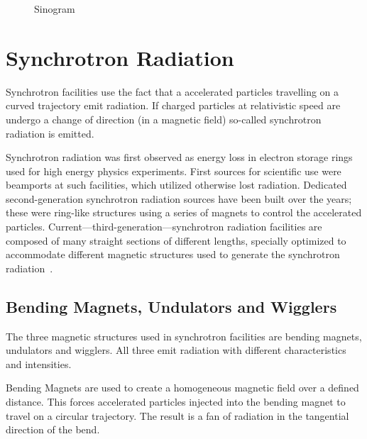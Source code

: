 \begin{figure}
	\caption{Sinogram}
	\label{fig:sinogram}
\end{figure}

\section{Synchrotron Radiation}
Synchrotron facilities use the fact that a accelerated particles travelling on a curved trajectory emit radiation. If charged particles at relativistic speed are undergo a change of direction (\ie in a magnetic field) so-called synchrotron radiation is emitted. 

Synchrotron radiation was first observed as energy loss in electron storage rings used for high energy physics experiments. First sources for scientific use were beamports at such facilities, which utilized otherwise lost radiation. Dedicated second-generation synchrotron radiation sources have been built over the years; these were ring-like structures using a series of magnets to control the accelerated particles. Current---third-generation---synchrotron radiation facilities are composed of many straight sections of different lengths, specially optimized to accommodate different magnetic structures used to generate the synchrotron radiation~\cite{Stampanoni2002a,Margaritondo2002,wwwsls}. 

\subsection{Bending Magnets, Undulators and Wigglers}
The three magnetic structures used in synchrotron facilities are bending magnets, undulators and wigglers. All three emit radiation with different characteristics and intensities.

Bending Magnets are used to create a homogeneous magnetic field over a defined distance. This forces accelerated particles injected into the bending magnet to travel on a circular trajectory. The result is a fan of radiation in the tangential direction of the bend.

